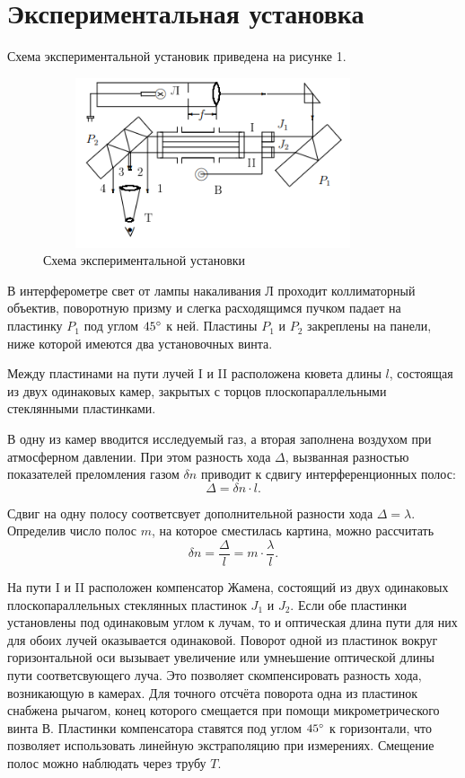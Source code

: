 \documentclass[12pt]{article}
\begin{document}
\section*{Экспериментальная установка}
\par
	Схема экспериментальной установик приведена на рисунке 1.
\begin{figure}[h!]
	\centering
	\includegraphics[width = 10cm, height = 5cm]{image1.png}
	\caption{Схема экспериментальной установки}
\end{figure}
\par
	В интерферометре свет от лампы накаливания Л проходит коллиматорный объектив, поворотную призму и слегка расходящимся пучком падает на пластинку $P_1$ под углом $45 \degree$ к ней. Пластины $P_1$ и $P_2$ закреплены на панели, ниже которой имеются два установочных винта. 
\par
	Между пластинами на пути лучей I и II расположена кювета длины $l$, состоящая из двух одинаковых камер, закрытых с торцов плоскопараллельными стеклянными пластинками.
\par
	В одну из камер вводится исследуемый газ, а вторая заполнена воздухом при атмосферном давлении. При этом разность хода $\Delta$, вызванная разностью показателей преломления газом $\delta n$ приводит к сдвигу интерференционных полос:
\[
	\Delta = \delta n \cdot l.
\]
\par
	Сдвиг на одну полосу соответсвует дополнительной разности хода $\Delta = \lambda$. Определив число полос $m$, на которое сместилась картина, можно рассчитать
\[
	\delta n = \frac{\Delta}{l} = m \cdot \frac{\lambda}{l}.
\]
\par
	На пути I и II расположен компенсатор Жамена, состоящий из двух одинаковых плоскопараллельных стеклянных пластинок $J_1$ и $J_2$. Если обе пластинки установлены под одинаковым углом к лучам, то и оптическая длина пути для них для обоих лучей оказывается одинаковой. Поворот одной из пластинок вокруг горизонтальной оси вызывает увеличение или умнеьшение оптической длины пути соответсвующего луча. Это позволяет скомпенсировать разность хода, возникающую в камерах. Для точного отсчёта поворота одна из пластинок снабжена рычагом, конец которого смещается при помощи микрометрического винта В. Пластинки компенсатора ставятся под углом $45 \degree$ к горизонтали, что позволяет использовать линейную экстраполяцию при измерениях. Смещение полос можно наблюдать через трубу $T$.
\end{document}
